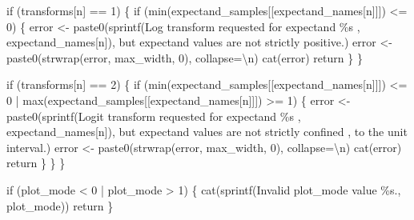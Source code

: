 \documentclass[
  letterpaper,
  DIV=11,
  numbers=noendperiod]{scrartcl}
\newenvironment{Shaded}{\begin{snugshade}}{\end{snugshade}}
\newcommand{\AttributeTok}[1]{\textcolor[rgb]{0.40,0.45,0.13}{#1}}
\newcommand{\ControlFlowTok}[1]{\textcolor[rgb]{0.00,0.23,0.31}{#1}}
\newcommand{\DecValTok}[1]{\textcolor[rgb]{0.68,0.00,0.00}{#1}}
\newcommand{\FunctionTok}[1]{\textcolor[rgb]{0.28,0.35,0.67}{#1}}
\newcommand{\NormalTok}[1]{\textcolor[rgb]{0.00,0.23,0.31}{#1}}
\newcommand{\OtherTok}[1]{\textcolor[rgb]{0.00,0.23,0.31}{#1}}
\newcommand{\SpecialCharTok}[1]{\textcolor[rgb]{0.37,0.37,0.37}{#1}}
\newcommand{\StringTok}[1]{\textcolor[rgb]{0.13,0.47,0.30}{#1}}
\begin{document}
\begin{Shaded}
\begin{Highlighting}[]
    \ControlFlowTok{if}\NormalTok{ (transforms[n] }\SpecialCharTok{==} \DecValTok{1}\NormalTok{) \{}
      \ControlFlowTok{if}\NormalTok{ (}\FunctionTok{min}\NormalTok{(expectand\_samples[[expectand\_names[n]]]) }\SpecialCharTok{\textless{}=} \DecValTok{0}\NormalTok{) \{}
\NormalTok{        error }\OtherTok{\textless{}{-}} 
          \FunctionTok{paste0}\NormalTok{(}\FunctionTok{sprintf}\NormalTok{(}\StringTok{\textquotesingle{}Log transform requested for expectand \%s \textquotesingle{}}\NormalTok{, }
\NormalTok{                         expectand\_names[n]),}
                 \StringTok{\textquotesingle{}but expectand values are not strictly positive.\textquotesingle{}}\NormalTok{)}
\NormalTok{        error }\OtherTok{\textless{}{-}} \FunctionTok{paste0}\NormalTok{(}\FunctionTok{strwrap}\NormalTok{(error, max\_width, }\DecValTok{0}\NormalTok{), }\AttributeTok{collapse=}\StringTok{\textquotesingle{}}\SpecialCharTok{\textbackslash{}n}\StringTok{\textquotesingle{}}\NormalTok{)}
        \FunctionTok{cat}\NormalTok{(error)}
\NormalTok{        return}
\NormalTok{      \}}
\NormalTok{    \}}
    
    \ControlFlowTok{if}\NormalTok{ (transforms[n] }\SpecialCharTok{==} \DecValTok{2}\NormalTok{) \{}
      \ControlFlowTok{if}\NormalTok{ (}\FunctionTok{min}\NormalTok{(expectand\_samples[[expectand\_names[n]]]) }\SpecialCharTok{\textless{}=} \DecValTok{0} \SpecialCharTok{|}
          \FunctionTok{max}\NormalTok{(expectand\_samples[[expectand\_names[n]]]) }\SpecialCharTok{\textgreater{}=} \DecValTok{1}\NormalTok{) \{}
\NormalTok{        error }\OtherTok{\textless{}{-}} 
          \FunctionTok{paste0}\NormalTok{(}\FunctionTok{sprintf}\NormalTok{(}\StringTok{\textquotesingle{}Logit transform requested for expectand \%s \textquotesingle{}}\NormalTok{, }
\NormalTok{                         expectand\_names[n]),}
                 \StringTok{\textquotesingle{}but expectand values are not strictly confined \textquotesingle{}}\NormalTok{,}
                 \StringTok{\textquotesingle{}to the unit interval.\textquotesingle{}}\NormalTok{)}
\NormalTok{        error }\OtherTok{\textless{}{-}} \FunctionTok{paste0}\NormalTok{(}\FunctionTok{strwrap}\NormalTok{(error, max\_width, }\DecValTok{0}\NormalTok{), }\AttributeTok{collapse=}\StringTok{\textquotesingle{}}\SpecialCharTok{\textbackslash{}n}\StringTok{\textquotesingle{}}\NormalTok{)}
        \FunctionTok{cat}\NormalTok{(error)}
\NormalTok{        return}
\NormalTok{      \}}
\NormalTok{    \}}
\NormalTok{  \}}
  
  \ControlFlowTok{if}\NormalTok{ (plot\_mode }\SpecialCharTok{\textless{}} \DecValTok{0} \SpecialCharTok{|}\NormalTok{ plot\_mode }\SpecialCharTok{\textgreater{}} \DecValTok{1}\NormalTok{) \{}
    \FunctionTok{cat}\NormalTok{(}\FunctionTok{sprintf}\NormalTok{(}\StringTok{\textquotesingle{}Invalid \textasciigrave{}plot\_mode\textasciigrave{} value \%s.\textquotesingle{}}\NormalTok{, plot\_mode))}
\NormalTok{    return}
\NormalTok{  \}}
  

\end{Highlighting}
\end{Shaded}
\end{document}
